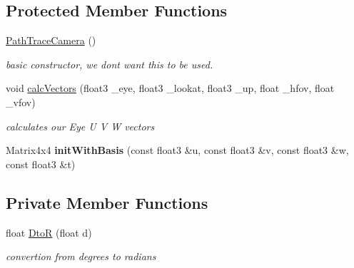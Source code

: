 \subsection*{Protected Member Functions}
\begin{DoxyCompactItemize}
\item 
\hypertarget{class_path_trace_camera_ac9127de546ce945978f7f1e54349f8f2}{\hyperlink{class_path_trace_camera_ac9127de546ce945978f7f1e54349f8f2}{Path\-Trace\-Camera} ()}\label{class_path_trace_camera_ac9127de546ce945978f7f1e54349f8f2}

\begin{DoxyCompactList}\small\item\em basic constructor, we dont want this to be used. \end{DoxyCompactList}\item 
void \hyperlink{class_path_trace_camera_a15324d53baba74608fe8efa0252ac15f}{calc\-Vectors} (float3 \-\_\-eye, float3 \-\_\-lookat, float3 \-\_\-up, float \-\_\-hfov, float \-\_\-vfov)
\begin{DoxyCompactList}\small\item\em calculates our Eye U V W vectors \end{DoxyCompactList}\item 
\hypertarget{class_path_trace_camera_a3640ebf43a68bef9b29ab869b15aafaa}{Matrix4x4 {\bfseries init\-With\-Basis} (const float3 \&u, const float3 \&v, const float3 \&w, const float3 \&t)}\label{class_path_trace_camera_a3640ebf43a68bef9b29ab869b15aafaa}

\end{DoxyCompactItemize}
\subsection*{Private Member Functions}
\begin{DoxyCompactItemize}
\item 
\hypertarget{class_path_trace_camera_a28449c858d39cb10d59f37a962c04af3}{float \hyperlink{class_path_trace_camera_a28449c858d39cb10d59f37a962c04af3}{Dto\-R} (float d)}\label{class_path_trace_camera_a28449c858d39cb10d59f37a962c04af3}

\begin{DoxyCompactList}\small\item\em convertion from degrees to radians \end{DoxyCompactList}\end{DoxyCompactItemize}

